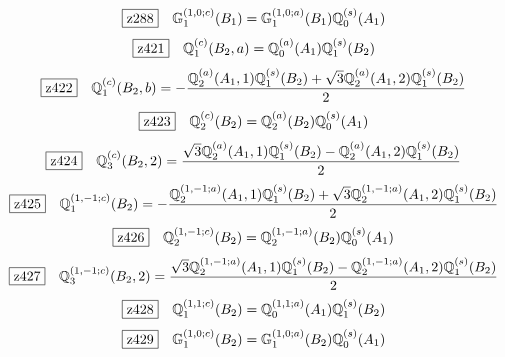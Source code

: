 \documentclass[fleqn,10pt,landscape]{jsarticle}
\begin{document}
\begin{dmath*}
\hspace*{3mm}\fbox{z288}\quad \mathbb{G}_{1}^{(1,0;c)}(B_{1})=\mathbb{G}_{1}^{(1,0;a)}(B_{1}) \mathbb{Q}_{0}^{(s)}(A_{1})
\end{dmath*}
\begin{dmath*}
\hspace*{3mm}\fbox{z421}\quad \mathbb{Q}_{1}^{(c)}(B_{2},a)=\mathbb{Q}_{0}^{(a)}(A_{1}) \mathbb{Q}_{1}^{(s)}(B_{2})
\end{dmath*}
\begin{dmath*}
\hspace*{3mm}\fbox{z422}\quad \mathbb{Q}_{1}^{(c)}(B_{2},b)=- \frac{\mathbb{Q}_{2}^{(a)}(A_{1},1) \mathbb{Q}_{1}^{(s)}(B_{2}) + \sqrt{3} \mathbb{Q}_{2}^{(a)}(A_{1},2) \mathbb{Q}_{1}^{(s)}(B_{2})}{2}
\end{dmath*}
\begin{dmath*}
\hspace*{3mm}\fbox{z423}\quad \mathbb{Q}_{2}^{(c)}(B_{2})=\mathbb{Q}_{2}^{(a)}(B_{2}) \mathbb{Q}_{0}^{(s)}(A_{1})
\end{dmath*}
\begin{dmath*}
\hspace*{3mm}\fbox{z424}\quad \mathbb{Q}_{3}^{(c)}(B_{2},2)=\frac{\sqrt{3} \mathbb{Q}_{2}^{(a)}(A_{1},1) \mathbb{Q}_{1}^{(s)}(B_{2}) - \mathbb{Q}_{2}^{(a)}(A_{1},2) \mathbb{Q}_{1}^{(s)}(B_{2})}{2}
\end{dmath*}
\begin{dmath*}
\hspace*{3mm}\fbox{z425}\quad \mathbb{Q}_{1}^{(1,-1;c)}(B_{2})=- \frac{\mathbb{Q}_{2}^{(1,-1;a)}(A_{1},1) \mathbb{Q}_{1}^{(s)}(B_{2}) + \sqrt{3} \mathbb{Q}_{2}^{(1,-1;a)}(A_{1},2) \mathbb{Q}_{1}^{(s)}(B_{2})}{2}
\end{dmath*}
\begin{dmath*}
\hspace*{3mm}\fbox{z426}\quad \mathbb{Q}_{2}^{(1,-1;c)}(B_{2})=\mathbb{Q}_{2}^{(1,-1;a)}(B_{2}) \mathbb{Q}_{0}^{(s)}(A_{1})
\end{dmath*}
\begin{dmath*}
\hspace*{3mm}\fbox{z427}\quad \mathbb{Q}_{3}^{(1,-1;c)}(B_{2},2)=\frac{\sqrt{3} \mathbb{Q}_{2}^{(1,-1;a)}(A_{1},1) \mathbb{Q}_{1}^{(s)}(B_{2}) - \mathbb{Q}_{2}^{(1,-1;a)}(A_{1},2) \mathbb{Q}_{1}^{(s)}(B_{2})}{2}
\end{dmath*}
\begin{dmath*}
\hspace*{3mm}\fbox{z428}\quad \mathbb{Q}_{1}^{(1,1;c)}(B_{2})=\mathbb{Q}_{0}^{(1,1;a)}(A_{1}) \mathbb{Q}_{1}^{(s)}(B_{2})
\end{dmath*}
\begin{dmath*}
\hspace*{3mm}\fbox{z429}\quad \mathbb{G}_{1}^{(1,0;c)}(B_{2})=\mathbb{G}_{1}^{(1,0;a)}(B_{2}) \mathbb{Q}_{0}^{(s)}(A_{1})
\end{dmath*}
\vspace{5mm}
\end{document}
